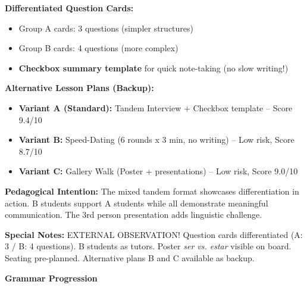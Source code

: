 \documentclass[11pt, a4paper]{article}
\newcommand{\es}[1]{\textcolor{spanisch}{\textit{#1}}}
\begin{document}
{{\vspace{0.2cm}


\textbf{Differentiated Question Cards:}
\begin{itemize}[nosep, leftmargin=1.5em]
    \item Group A cards: 3 questions (simpler structures)
    \item Group B cards: 4 questions (more complex)
    \item \textbf{Checkbox summary template} for quick note-taking (no slow writing!)
\end{itemize}

\textbf{Alternative Lesson Plans (Backup):}
\begin{itemize}[nosep, leftmargin=1.5em]
    \item \textbf{Variant A (Standard):} Tandem Interview + Checkbox template -- Score 9.4/10
    \item \textbf{Variant B:} Speed-Dating (6 rounds x 3 min, no writing) -- Low risk, Score 8.7/10
    \item \textbf{Variant C:} Gallery Walk (Poster + presentations) -- Low risk, Score 9.0/10
\end{itemize}

\textbf{Pedagogical Intention:} The mixed tandem format showcases differentiation in action. B students support A students while all demonstrate meaningful communication. The 3rd person presentation adds linguistic challenge.

\textbf{Special Notes:} \textcolor{beobachtung}{EXTERNAL OBSERVATION!} Question cards differentiated (A: 3 / B: 4 questions). B students as tutors. Poster \es{ser vs. estar} visible on board. Seating pre-planned. Alternative plans B and C available as backup.
}}

\newpage


{\large\bfseries\color{spanisch} Grammar Progression}

\vspace{0.3cm}
\end{document}
